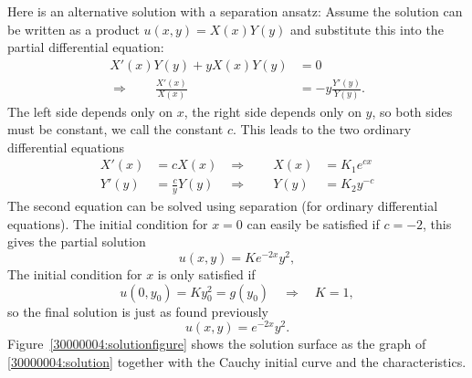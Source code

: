 \begin{loesung}
Here is an alternative solution with a separation ansatz:
Assume the solution can be written as a product $u(x,y)=X(x)Y(y)$
and substitute this into the partial differential equation:
\begin{align*}
X'(x)Y(y)+yX(x)Y(y)&=0\\
\Rightarrow\qquad \frac{X'(x)}{X(x)}&=-y\frac{Y'(y)}{Y(y)}.
\end{align*}
The left side depends only on $x$, the right side depends only on $y$,
so both sides must be constant, we call the constant $c$.
This leads to the two ordinary differential equations
\begin{align*}
X'(x)&=cX(x)&\Rightarrow\qquad X(x)&=K_1e^{cx}\\
Y'(y)&=\frac{c}{y}Y(y)&\Rightarrow\qquad Y(y)&=K_2y^{-c}
\end{align*}
The second equation can be solved using separation (for ordinary
differential equations).
The initial condition for $x=0$ can easily be satisfied if
$c=-2$, this gives the partial solution
\[
u(x,y)=Ke^{-2x}y^2,
\]
The initial condition for $x$ is only satisfied  if
\[
u(0,y_0)=Ky_0^2=g(y_0)\quad\Rightarrow\quad K=1,
\]
so the final solution is just as found previously
\begin{equation}
u(x,y)=e^{-2x}y^2.
\label{30000004:solution}
\end{equation}
Figure~\ref{30000004:solutionfigure} shows the solution surface as the
graph of \eqref{30000004:solution} together 
with the Cauchy initial curve and the characteristics.
\end{loesung}
